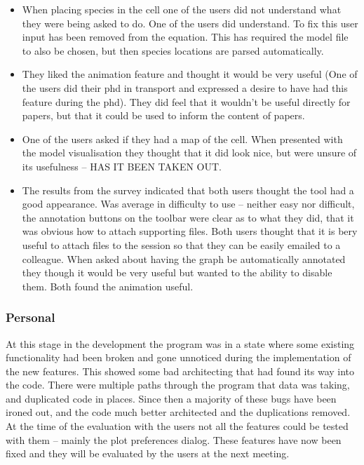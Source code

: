 \begin{itemize}
\item When placing species in the cell one of the users did not understand what they were being asked to do.  One of the users did understand.  To fix this user input has been removed from the equation.  This has required the model file to also be chosen, but then species locations are parsed automatically.
\item They liked the animation feature and thought it would be very useful (One of the users did their phd in transport and expressed a desire to have had this feature during the phd).  They did feel that it wouldn't be useful directly for papers, but that it could be used to inform the content of papers.
\item One of the users asked if they had a map of the cell.  When presented with the model visualisation they thought that it did look nice, but were unsure of its usefulness -- HAS IT BEEN TAKEN OUT.
\item The results from the survey indicated that both users thought the tool had a good appearance.  Was average in difficulty to use -- neither easy nor difficult, the annotation buttons on the toolbar were clear as to what they did, that it was obvious how to attach supporting files.  Both users thought that it is bery useful to attach files to the session so that they can be easily emailed to a colleague.  When asked about having the graph be automatically annotated they though it would be very useful but wanted to the ability to disable them.  Both found the animation useful.
\end{itemize}

\subsubsection{Personal}

At this stage in the development the program was in a state where some existing functionality had been broken and gone unnoticed during the implementation of the new features.  This showed some bad architecting that had found its way into the code.  There were multiple paths through the program that data was taking, and duplicated code in places.  Since then a majority of these bugs have been ironed out, and the code much better architected and the duplications removed.  At the time of the evaluation with the users not all the features could be tested with them -- mainly the plot preferences dialog.  These features have now been fixed and they will be evaluated by the users at the next meeting.

